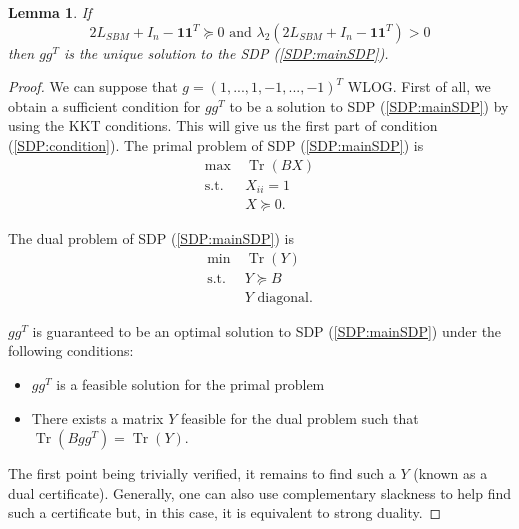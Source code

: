 \documentclass[english]{article}
\newtheorem{lemma}{Lemma}
\newcommand{\1}{\textbf{1}}
\newcommand{\tr}{\operatorname{Tr}}
\begin{document}
\begin{lemma} \label{lemma:lemma1SDP}
If
\begin{equation}
2L_{SBM} +I_n-\1\1^T \succeq 0 \text{ and } \lambda_2\left(2L_{SBM} +I_n-\1\1^T\right)>0 \label{SDP:condition}
\end{equation} 
then $gg^T$ is the unique solution to the SDP (\ref{SDP:mainSDP}).
\end{lemma}
\begin{proof}
We can suppose that $g=(1,...,1,-1,...,-1)^T$ WLOG.
First of all, we obtain a sufficient condition for $gg^T$ to be a solution to SDP (\ref{SDP:mainSDP}) by using the KKT conditions. This will give us the first part of condition (\ref{SDP:condition}).
The primal problem of SDP (\ref{SDP:mainSDP}) is
\begin{align}
\max\ & \tr (BX)\nonumber\\
\text{s.t.}\ &X_{ii}=1 \nonumber \\
& X\succeq 0.\nonumber
\end{align}

The dual problem of SDP (\ref{SDP:mainSDP}) is
\begin{align}
\min\ & \tr (Y)\nonumber\\
\text{s.t.}\ &Y \succeq B \label{SDP:dual1}\\
& Y \text{ diagonal}. \nonumber
\end{align}

$gg^T$ is guaranteed to be an optimal solution to SDP (\ref{SDP:mainSDP}) under the following conditions:
\begin{itemize}
\item $gg^T$ is a feasible solution for the primal problem
\item There exists a matrix $Y$ feasible for the dual problem such that $\tr(Bgg^T)= \tr(Y)$.
\end{itemize}
The first point being trivially verified, it remains to find such a $Y$ (known as a dual certificate). Generally, one can also use complementary slackness to help find such a certificate but, in this case, it is equivalent to strong duality.


\end{proof}
\end{document}
